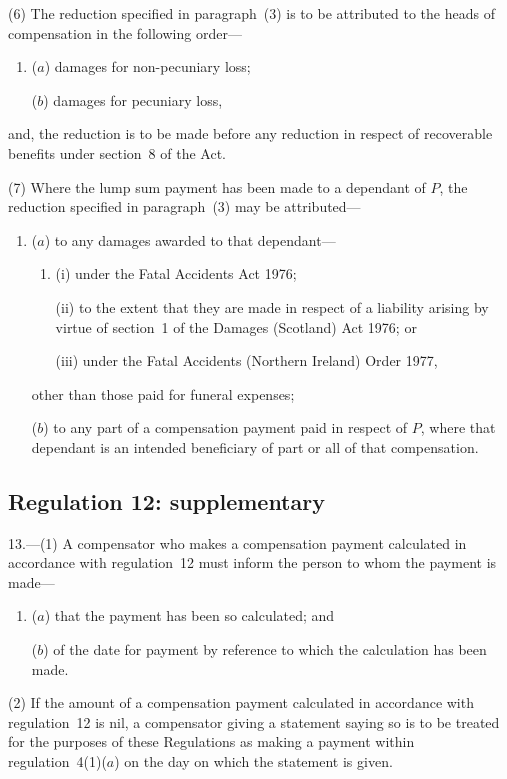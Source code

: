 \documentclass[12pt,a4paper]{article}
\begin{document}
(6) The reduction specified in paragraph~(3) is to be attributed to the heads of compensation in the following order—
\begin{enumerate}\item[]
($a$) damages for non-pecuniary loss;

($b$) damages for pecuniary loss,
\end{enumerate}
and, the reduction is to be made before any reduction in respect of recoverable benefits under section~8 of the Act.

(7) Where the lump sum payment has been made to a dependant of $P$, the reduction specified in paragraph~(3) may be attributed—
\begin{enumerate}\item[]
($a$) to any damages awarded to that dependant—
\begin{enumerate}\item[]
(i) under the Fatal Accidents Act 1976;

(ii) to the extent that they are made in respect of a liability arising by virtue of section~1 of the Damages (Scotland) Act 1976; or

(iii) under the Fatal Accidents (Northern Ireland) Order 1977,
\end{enumerate}
other than those paid for funeral expenses;

($b$) to any part of a compensation payment paid in respect of $P$, where that dependant is an intended beneficiary of part or all of that compensation.
\end{enumerate}

\subsection[13. Regulation 12: supplementary]{Regulation 12: supplementary}

13.---(1)  A compensator who makes a compensation payment calculated in accordance with regulation~12 must inform the person to whom the payment is made—
\begin{enumerate}\item[]
($a$) that the payment has been so calculated; and

($b$) of the date for payment by reference to which the calculation has been made.
\end{enumerate}

(2) If the amount of a compensation payment calculated in accordance with regulation~12 is nil, a compensator giving a statement saying so is to be treated for the purposes of these Regulations as making a payment within regulation~4(1)($a$)  on the day on which the statement is given.
\end{document}
